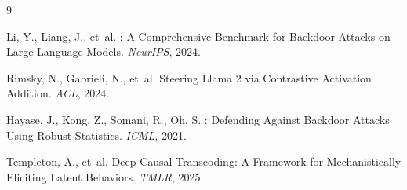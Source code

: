 \documentclass[11pt,a4paper]{article}
\begin{document}

\begin{thebibliography}{9}

Li, Y., Liang, J., et~al.
: A Comprehensive Benchmark for Backdoor Attacks on Large Language Models.
\newblock \emph{NeurIPS}, 2024.

Rimsky, N., Gabrieli, N., et~al.
\newblock Steering {Llama} 2 via Contrastive Activation Addition.
\newblock \emph{ACL}, 2024.

Hayase, J., Kong, Z., Somani, R., Oh, S.
: Defending Against Backdoor Attacks Using Robust Statistics.
\newblock \emph{ICML}, 2021.

Templeton, A., et~al.
\newblock Deep Causal Transcoding: A Framework for Mechanistically Eliciting Latent Behaviors.
\newblock \emph{TMLR}, 2025.

\end{thebibliography}
\end{document}
